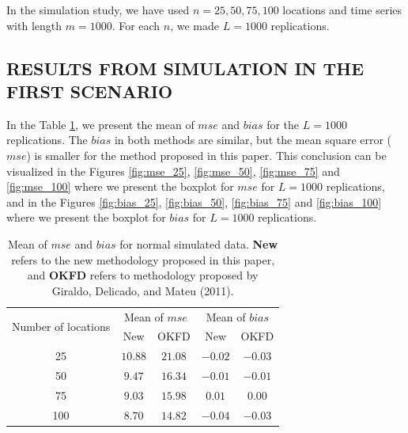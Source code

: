 \documentclass[12pt,]{article}
\theoremstyle{definition}
\theoremstyle{definition}
\theoremstyle{definition}
\theoremstyle{remark}
\begin{document}
In the simulation study, we have used \(n=25,50,75,100\) locations and time series with length \(m=1000\). For each \(n\), we made \(L=1000\) replications.

\hypertarget{results-from-simulation-in-the-first-scenario}{%
\subsection*{RESULTS FROM SIMULATION IN THE FIRST SCENARIO}\label{results-from-simulation-in-the-first-scenario}}

In the Table \ref{tab:summary-normal}, we present the mean of \(mse\) and \(bias\) for the \(L=1000\) replications. The \(bias\) in both methods are similar, but the mean square error (\(mse\)) is smaller for the method proposed in this paper. This conclusion can be visualized in the Figures \ref{fig:mse_25}, \ref{fig:mse_50}, \ref{fig:mse_75} and \ref{fig:mse_100} where we present the boxplot for \(mse\) for \(L=1000\) replications, and in the Figures \ref{fig:bias_25}, \ref{fig:bias_50}, \ref{fig:bias_75} and \ref{fig:bias_100} where we present the boxplot for \(bias\) for \(L=1000\) replications.

\begin{table}[htbp]
 \centering
 \caption{Mean of $mse$ and $bias$ for normal simulated data. \textbf{New} refers to the new methodology proposed in this paper, and \textbf{OKFD} refers to methodology proposed by Giraldo, Delicado, and Mateu (2011).}
 \label{tab:summary-normal}
  \begin{tabular}{ccc|cc}
  \toprule
   \multirow{2}{*}{Number of locations}& \multicolumn{2}{c|}{Mean of $mse$} & \multicolumn{2}{|c}{Mean of $bias$}\\ \cmidrule{2-5}
    & New & OKFD & New & OKFD \\ \midrule
    25 & $10.88$ & $21.08$ & $-0.02$ & $-0.03$\\
    50 & $9.47$ & $16.34$ & $-0.01$ & $-0.01$\\
    75 & $9.03$ & $15.98$ & $0.01$ & $0.00$\\
    100 & $8.70$ & $14.82$ & $-0.04$ & $-0.03$\\ \bottomrule
  \end{tabular}
\end{table}
\end{document}
